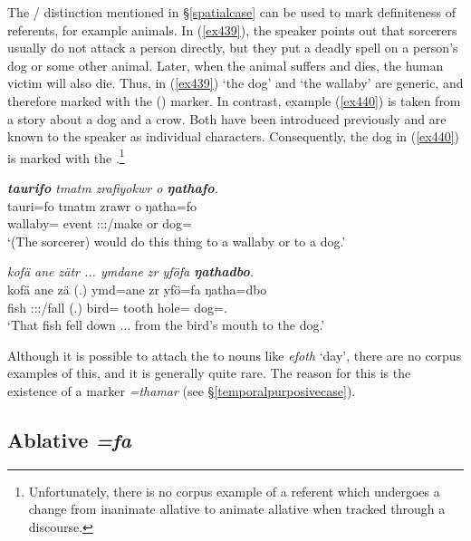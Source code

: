 The / distinction mentioned in \S{}\ref{spatialcase} can be used to mark definiteness of  referents, for example animals. In (\ref{ex439}), the speaker points out that sorcerers usually do not attack a person directly, but they put a deadly spell on a person's dog or some other animal. Later, when the animal suffers and dies, the human victim will also die. Thus, in (\ref{ex439}) `the dog' and `the wallaby' are generic, and therefore marked with the ()   marker. In contrast, example (\ref{ex440}) is taken from a story about a dog and a crow. Both have been introduced previously and are known to the speaker as individual characters. Consequently, the dog in (\ref{ex440}) is marked with the  .\footnote{Unfortunately, there is no corpus example of a referent which undergoes a change from inanimate allative to animate allative when tracked through a discourse.}

\begin{exe}
	\ex \emph{\textbf{taurifo} tmatm zrafiyokwr o \textbf{ŋathafo}.}\\
	\gll tauri=fo tmatm zrawr o ŋatha=fo\\
	wallaby=\All{} event \Stsg:\Sbj:\Irr:\Ipfv/make or dog=\All\\
	\trans `(The sorcerer) would do this thing to a wallaby or to a dog.'\\
	\label{ex439}
\end{exe}
\begin{exe}
	\ex \emph{kofä ane zätr ... ymdane zr yföfa \textbf{ŋathadbo}.}\\
	\gll kofä ane zä (.) ymd=ane zr yfö=fa ŋatha=dbo\\
	fish \Dem{} \Stsg:\Sbj:\Rpst:\Pfv/fall (.) bird=\Poss{} tooth hole=\Abl{} dog=\All.\Anim\\
	\trans `That fish fell down ... from the bird's mouth to the dog.'\\
	\label{ex440}
\end{exe}
	
Although it is possible to attach the  to  nouns like \emph{efoth} `day', there are no corpus examples of this, and it is generally quite rare. The reason for this is the existence of a    marker \emph{=thamar} (see \S{}\ref{temporalpurposivecase}).

\subsection{Ablative \emph{=fa}} \label{ablativecase}

